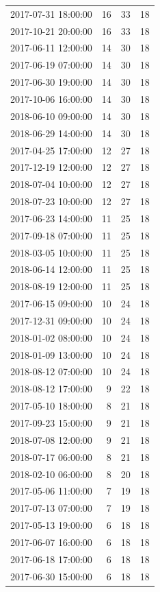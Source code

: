 \begin{tabular}{lrrr}
2017-07-31 18:00:00 & 16 & 33 & 18 \\
2017-10-21 20:00:00 & 16 & 33 & 18 \\
2017-06-11 12:00:00 & 14 & 30 & 18 \\
2017-06-19 07:00:00 & 14 & 30 & 18 \\
2017-06-30 19:00:00 & 14 & 30 & 18 \\
2017-10-06 16:00:00 & 14 & 30 & 18 \\
2018-06-10 09:00:00 & 14 & 30 & 18 \\
2018-06-29 14:00:00 & 14 & 30 & 18 \\
2017-04-25 17:00:00 & 12 & 27 & 18 \\
2017-12-19 12:00:00 & 12 & 27 & 18 \\
2018-07-04 10:00:00 & 12 & 27 & 18 \\
2018-07-23 10:00:00 & 12 & 27 & 18 \\
2017-06-23 14:00:00 & 11 & 25 & 18 \\
2017-09-18 07:00:00 & 11 & 25 & 18 \\
2018-03-05 10:00:00 & 11 & 25 & 18 \\
2018-06-14 12:00:00 & 11 & 25 & 18 \\
2018-08-19 12:00:00 & 11 & 25 & 18 \\
2017-06-15 09:00:00 & 10 & 24 & 18 \\
2017-12-31 09:00:00 & 10 & 24 & 18 \\
2018-01-02 08:00:00 & 10 & 24 & 18 \\
2018-01-09 13:00:00 & 10 & 24 & 18 \\
2018-08-12 07:00:00 & 10 & 24 & 18 \\
2018-08-12 17:00:00 & 9 & 22 & 18 \\
2017-05-10 18:00:00 & 8 & 21 & 18 \\
2017-09-23 15:00:00 & 9 & 21 & 18 \\
2018-07-08 12:00:00 & 9 & 21 & 18 \\
2018-07-17 06:00:00 & 8 & 21 & 18 \\
2018-02-10 06:00:00 & 8 & 20 & 18 \\
2017-05-06 11:00:00 & 7 & 19 & 18 \\
2017-07-13 07:00:00 & 7 & 19 & 18 \\
2017-05-13 19:00:00 & 6 & 18 & 18 \\
2017-06-07 16:00:00 & 6 & 18 & 18 \\
2017-06-18 17:00:00 & 6 & 18 & 18 \\
2017-06-30 15:00:00 & 6 & 18 & 18 \\

\end{tabular}

